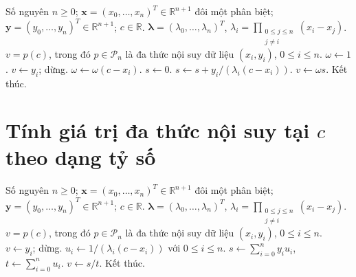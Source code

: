 \documentclass[12pt,a4paper,oneside]{book}
\numberwithin{algorithm}{chapter}
\theoremstyle{definition}
\newcommand{\R}{\mathbb{R}}
\begin{document}
\begin{algorithm}[H]
\caption{Tính giá trị đa thức nội suy tại $c$ theo dạng $\omega_{n+1}$ -- chi tiết}
\label{alg:lagrange-omega-evaluate}
\begin{algorithmic}[1]
\Require Số nguyên $n\geq0$; $\boldsymbol x=(x_0,\ldots,x_n)^T\in\R^{n+1}$ đôi một phân biệt; $\boldsymbol y=(y_0,\ldots,y_n)^T\in\R^{n+1}$; $c\in\R$. $\boldsymbol\lambda=(\lambda_0,\ldots,\lambda_n)^T$, $\lambda_i=\prod_{\substack{0\leq j\leq n\\j\ne i}}(x_i-x_j)$.
\Ensure $v=p(c)$, trong đó $p\in\mathcal P_n$ là đa thức nội suy dữ liệu $(x_i,y_i)$, $0\leq i\leq n$.
\State $\omega\gets1$.
    \State $v\gets y_i$; dừng.
  \EndIf
\Statex
  \State $\omega\gets\omega(c-x_i)$.
\EndFor
\Statex
\State $s\gets0$.
  \State $s\gets s+y_i/(\lambda_i(c-x_i))$.
\EndFor
\Statex
\State $v\gets\omega s$.
\State Kết thúc.
\end{algorithmic}
\end{algorithm}

\section{Tính giá trị đa thức nội suy tại \texorpdfstring{$c$}{c} theo dạng tỷ số}
\begin{algorithm}[H]
\caption{Tính giá trị đa thức nội suy tại $c$ theo dạng tỷ số -- sơ lược}
\label{alg:barycentric-evaluate-short}
\begin{algorithmic}[1]
\Require Số nguyên $n\geq0$; $\boldsymbol x=(x_0,\ldots,x_n)^T\in\R^{n+1}$ đôi một phân biệt; $\boldsymbol y=(y_0,\ldots,y_n)^T\in\R^{n+1}$; $c\in\R$. $\boldsymbol\lambda=(\lambda_0,\ldots,\lambda_n)^T$, $\lambda_i=\prod_{\substack{0\leq j\leq n\\j\ne i}}(x_i-x_j)$.
\Ensure $v=p(c)$, trong đó $p\in\mathcal P_n$ là đa thức nội suy dữ liệu $(x_i,y_i)$, $0\leq i\leq n$.
  \State $v\gets y_i$; dừng.
\EndIf
\Statex
\State $u_i\gets1/(\lambda_i(c-x_i))$ với $0\leq i\leq n$.
\State $\displaystyle s\gets\sum_{i=0}^{n}y_iu_i$, $\displaystyle t\gets\sum_{i=0}^{n}u_i$.
\State $v\gets s/t$.
\State Kết thúc.
\end{algorithmic}
\end{algorithm}
\end{document}
